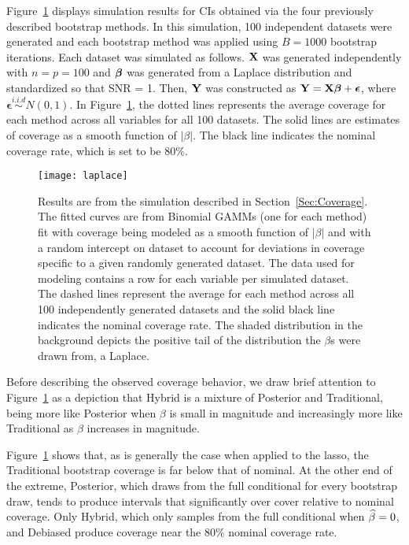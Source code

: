 Figure~\ref{Fig:laplace} displays simulation results for CIs obtained via the four previously described bootstrap methods. In this simulation, 100 independent datasets were generated and each bootstrap method was applied using $B = 1000$ bootstrap iterations. Each dataset was simulated as follows. $\mathbf{X}$ was generated independently with $n = p = 100$ and $\boldsymbol{\beta}$ was generated from a Laplace distribution and standardized so that SNR = 1. Then, $\mathbf{Y}$ was constructed as $\mathbf{Y} = \mathbf{X}\boldsymbol{\beta} + \boldsymbol{\epsilon}$, where $\boldsymbol{\epsilon} \overset{i.i.d}{\sim} N(0, 1)$. In Figure~\ref{Fig:laplace}, the dotted lines represents the average coverage for each method across all variables for all 100 datasets. The solid lines are estimates of coverage as a smooth function of $|\beta|$. The black line indicates the nominal coverage rate, which is set to be 80\%.

\begin{figure}[hbtp]
  \begin{center}
  \texttt{[image: laplace]}
  \caption{\label{Fig:laplace} Results are from the simulation described in Section~\ref{Sec:Coverage}. The fitted curves are from Binomial GAMMs (one for each method) fit with coverage being modeled as a smooth function of $|\beta|$ and with a random intercept on dataset to account for deviations in coverage specific to a given randomly generated dataset. The data used for modeling contains a row for each variable per simulated dataset. The dashed lines represent the average for each method across all 100 independently generated datasets and the solid black line indicates the nominal coverage rate. The shaded distribution in the background depicts the positive tail of the distribution the $\beta$s were drawn from, a Laplace.}
  \end{center}
\end{figure}

Before describing the observed coverage behavior, we draw brief attention to Figure~\ref{Fig:laplace} as a depiction that Hybrid is a mixture of Posterior and Traditional, being more like Posterior when $\beta$ is small in magnitude and increasingly more like Traditional as $\beta$ increases in magnitude.

Figure~\ref{Fig:laplace} shows that, as is generally the case when applied to the lasso, the Traditional bootstrap coverage is far below that of nominal. At the other end of the extreme, Posterior, which draws from the full conditional for every bootstrap draw, tends to produce intervals that significantly over cover relative to nominal coverage. Only Hybrid, which only samples from the full conditional when $\widehat{\beta} = 0$, and Debiased produce coverage near the $80\%$ nominal coverage rate.

